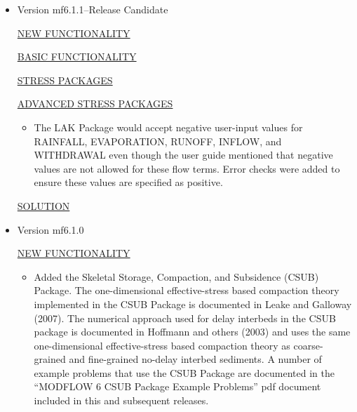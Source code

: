 \documentclass[11pt,twoside,twocolumn]{usgsreport}
\begin{document}
\begin{itemize}
\item Version mf6.1.1--Release Candidate

\underline{NEW FUNCTIONALITY}

\underline{BASIC FUNCTIONALITY}

\underline{STRESS PACKAGES}

\underline{ADVANCED STRESS PACKAGES}
\begin{itemize}
\item The LAK Package would accept negative user-input values for  RAINFALL, EVAPORATION, RUNOFF, INFLOW, and WITHDRAWAL even though the user guide mentioned that negative values are not allowed for these flow terms.  Error checks were added to ensure these values are specified as positive.
\end{itemize}

\underline{SOLUTION}

\item Version mf6.1.0

\underline{NEW FUNCTIONALITY}
\begin{itemize}
	\item Added the Skeletal Storage, Compaction, and Subsidence (CSUB) Package. The one-dimensional effective-stress based compaction theory implemented in the CSUB Package is documented in Leake and Galloway (2007). The numerical approach used for delay interbeds in the CSUB package is documented in Hoffmann and others (2003) and uses the same one-dimensional effective-stress based compaction theory as coarse-grained and fine-grained no-delay interbed sediments. A number of example problems that use the CSUB Package are documented in the ``MODFLOW 6 CSUB Package Example Problems'' pdf document included in this and subsequent releases.
\end{itemize}


\end{itemize}
\end{document}
